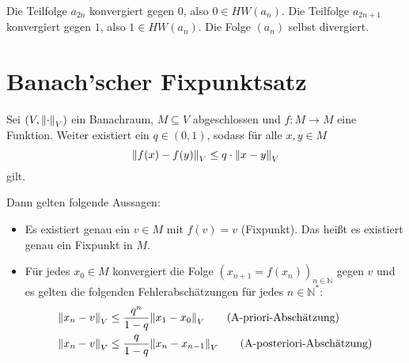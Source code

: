             Die Teilfolge $ a _ { 2n } $ konvergiert gegen $ 0 $, also $ 0 \in HW(a _ n) $. Die Teilfolge $ a _ { 2n + 1 } $ konvergiert gegen $ 1 $, also $ 1 \in HW(a _ n) $. Die Folge $ (a _ n) $ selbst divergiert.

    \section{Banach'scher Fixpunktsatz}
        Sei $ (V, \norm{\cdot} _ V) $ ein Banachraum, $ M \subseteq V $ abgeschlossen und $ f : M \rightarrow M $ eine Funktion. Weiter existiert ein $ q \in (0, 1) $, sodass für alle $ x, y \in M $ \[ \norm{f(x) - f(y)} _ V \leq q \cdot \norm{x - y} _ V \] gilt.

        Dann gelten folgende Aussagen:
        \begin{itemize}
            \item Es existiert genau ein $ v \in M $ mit $ f(v) = v $ (Fixpunkt). Das heißt es existiert genau ein Fixpunkt in $ M $.
            \item Für jedes $ x _ 0 \in M $ konvergiert die Folge $ (x _ { n + 1 } = f(x _ n)) _ { n \in \mathbb{N} } $ gegen $ v $ und es gelten die folgenden Fehlerabschätzungen für jedes $ n \in \mathbb{N} ^ * $:
                \begin{align*}
                    \norm{x _ n - v} _ V &\leq \frac{q ^ n}{1 - q} \norm{x _ 1 - x _ 0} _ V \tag{A-priori-Abschätzung} \\
                    \norm{x _ n - v} _ V &\leq \frac{q}{1 - q} \norm{x _ n - x _ { n - 1 }} _ V \tag{A-posteriori-Abschätzung} \\
                \end{align*}
        \end{itemize}

